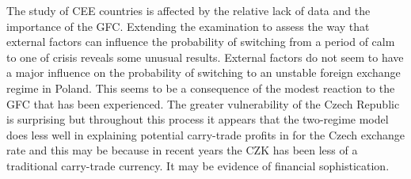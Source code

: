 \documentclass[12pt, a4paper, oneside]{article}\usepackage[]{graphicx}\usepackage[]{color}
\begin{document}
The study of CEE countries is affected by the relative lack of data and the importance of the GFC.  Extending the examination to assess the way that external factors can influence the probability of switching from a period of calm to one of crisis reveals some unusual results.  External factors do not seem to have a major influence on the probability of switching to an unstable foreign exchange regime in Poland.    This seems to be a consequence of the modest reaction to the GFC that has been experienced.  The greater vulnerability of the Czech Republic is surprising but throughout this process it appears that the two-regime model does less well in explaining potential carry-trade profits in for the Czech exchange rate and this may be because in recent years the CZK has been less of a traditional carry-trade currency. It may be evidence of financial sophistication. 


\end{document}

